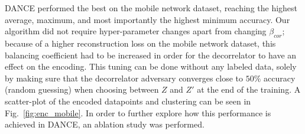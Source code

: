 			\ac{DANCE} performed the best on the mobile network dataset, reaching the highest average, maximum, and most importantly the highest minimum accuracy.
			Our algorithm did not require hyper-parameter changes apart from changing $\beta_{cor}$; because of a higher reconstruction loss on the mobile network dataset, this balancing coefficient had to be increased in order for the decorrelator to have an effect on the encoding.
			This tuning can be done without any labeled data, solely by making sure that the decorrelator adversary converges close to $50\%$ accuracy (random guessing) when choosing between $Z$ and $Z'$ at the end of the training.
			A scatter-plot of the encoded datapoints and clustering can be seen in Fig.~\ref{fig:enc_mobile}.
			In order to further explore how this performance is achieved in \ac{DANCE}, an ablation study was performed.
			
